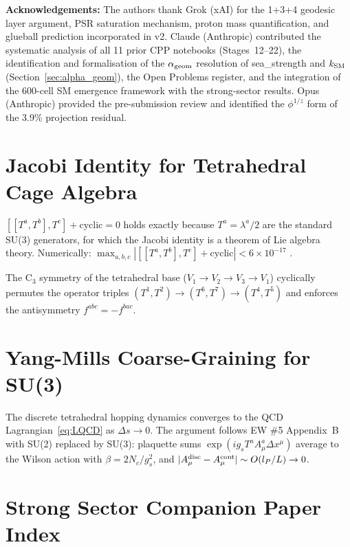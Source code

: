 \documentclass[11pt,a4paper]{article}
\newcommand{\lP}{l_P}
\begin{document}
\noindent\textbf{Acknowledgements:}
The authors thank Grok (xAI) for the 1+3+4 geodesic layer argument,
PSR saturation mechanism, proton mass quantification, and glueball
prediction incorporated in v2.  Claude (Anthropic) contributed the
systematic analysis of all 11 prior CPP notebooks (Stages~12--22),
the identification and formalisation of the $\alpha_{\rm geom}$
resolution of sea\_strength and $k_{\rm SM}$ (Section~\ref{sec:alpha_geom}),
the Open Problems register, and the integration of the 600-cell SM
emergence framework with the strong-sector results.  Opus
(Anthropic) provided the pre-submission review and identified
the $\phi^{1/z}$ form of the 3.9\% projection residual.

\appendix

\section{Jacobi Identity for Tetrahedral Cage Algebra}
\label{app:jacobi}

$[[T^a,T^b],T^c]+\text{cyclic}=0$ holds exactly because $T^a =
\lambda^a/2$ are the standard SU(3) generators, for which the Jacobi
identity is a theorem of Lie algebra theory.  Numerically:
$\max_{a,b,c}|[[T^a,T^b],T^c]+\text{cyclic}| < 6\times10^{-17}$
\citep{cpp_ss_mc}.

The C$_3$ symmetry of the tetrahedral base ($V_1\to V_2\to V_3\to
V_1$) cyclically permutes the operator triples
$(T^1,T^2)\to(T^6,T^7)\to(T^4,T^5)$ and enforces the
antisymmetry $f^{abc} = -f^{bac}$.

\section{Yang-Mills Coarse-Graining for SU(3)}
\label{app:coarse}

The discrete tetrahedral hopping dynamics converges to the QCD
Lagrangian~\eqref{eq:LQCD} as $\Delta s\to 0$.  The argument
follows EW \#5 Appendix~B~\citep{cpp_ew5} with SU(2) replaced
by SU(3): plaquette sums $\exp(ig_s T^a A^a_\mu\Delta x^\mu)$
average to the Wilson action with $\beta = 2N_c/g_s^2$, and
$|A_\mu^{\rm disc} - A_\mu^{\rm cont}|\sim O(\lP/L)\to0$.

\section{Strong Sector Companion Paper Index}
\label{app:index}
\end{document}
